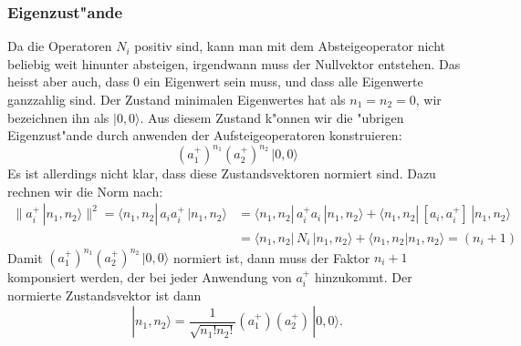 \subsubsection{Eigenzust"ande}
Da die Operatoren $N_i$ positiv sind, kann man mit dem Absteigeoperator
nicht beliebig weit hinunter absteigen, irgendwann muss der Nullvektor
entstehen.
Das heisst aber auch, dass $0$ ein Eigenwert sein muss, und dass alle
Eigenwerte ganzzahlig sind.
Der Zustand minimalen Eigenwertes hat als $n_1=n_2=0$, wir bezeichnen
ihn als $|0,0\rangle$.
Aus diesem Zustand k"onnen wir die "ubrigen Eigenzust"ande durch anwenden
der Aufsteigeoperatoren konstruieren:
\[
(a_1^+)^{n_1} (a_2^+)^{n_2} \,|0,0\rangle
\]
Es ist allerdings nicht klar, dass diese Zustandsvektoren normiert sind.
Dazu rechnen wir die Norm nach:
\begin{align*}
\|
a_i^+\,|n_1,n_2\rangle
\|^2
=
\langle n_1,n_2|\,a_i a_i^+\,|n_1,n_2\rangle
&=
\langle n_1,n_2|\,a_i^+a_i\,|n_1,n_2\rangle
+
\langle n_1,n_2|\,[a_i,a_i^+]\,|n_1,n_2\rangle
\\
&=
\langle n_1,n_2|\,N_i\,|n_1,n_2\rangle
+
\langle n_1,n_2|n_1,n_2\rangle
=(n_i+1)
\end{align*}
Damit 
$(a_1^+)^{n_1} (a_2^+)^{n_2}\, |0,0\rangle$
normiert ist, dann muss der Faktor $n_i+1$ komponsiert werden,
der bei jeder Anwendung von $a_i^+$ hinzukommt.
Der normierte Zustandsvektor ist dann
\[
|n_1,n_2\rangle
=
\frac1{\sqrt{n_1!n_2!}} (a_1^+) (a_2^+)  \, |0,0\rangle.
\]

